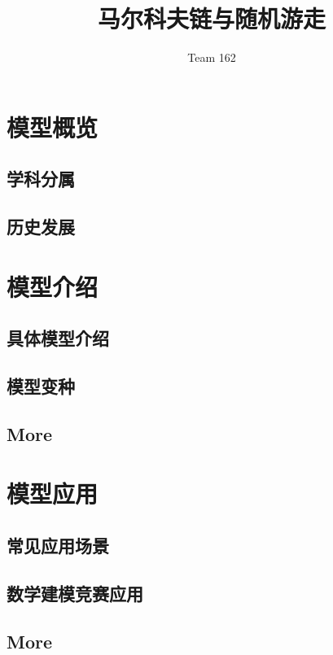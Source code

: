 \documentclass{ctexart}
\title{\textbf{马尔科夫链与随机游走}}
\author{Team 162}
\begin{document}
\maketitle
\tableofcontents
\section{模型概览}

\subsection{学科分属}

\subsection{历史发展}

\section{模型介绍}

\subsection{具体模型介绍}

\subsection{模型变种}

\subsection{More}


\section{模型应用}

\subsection{常见应用场景}


\subsection{数学建模竞赛应用}

\subsection{More}
\end{document}
